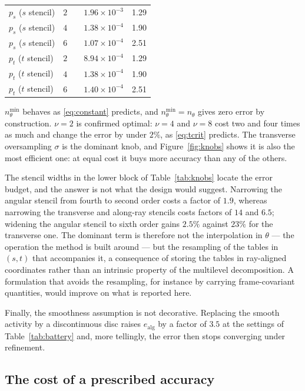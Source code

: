 \documentclass[11pt]{article}
\begin{document}
\begin{table}[t]
\begin{tabular}{llrrr}
\addlinespace
$p_s$ ($s$ stencil) & $2$ &  & $1.96\!\times\!10^{-3}$ & 1.29 \\
$p_s$ ($s$ stencil) & $4$ &  & $1.38\!\times\!10^{-4}$ & 1.90 \\
$p_s$ ($s$ stencil) & $6$ &  & $1.07\!\times\!10^{-4}$ & 2.51 \\
\addlinespace
$p_t$ ($t$ stencil) & $2$ &  & $8.94\!\times\!10^{-4}$ & 1.29 \\
$p_t$ ($t$ stencil) & $4$ &  & $1.38\!\times\!10^{-4}$ & 1.90 \\
$p_t$ ($t$ stencil) & $6$ &  & $1.40\!\times\!10^{-4}$ & 2.51 \\
\bottomrule
\end{tabular}
\end{table}

$n_\theta^{\min}$ behaves as \eqref{eq:constant} predicts, and
$n_\theta^{\min}=n_\theta$ gives zero error by construction. $\nu=2$ is
confirmed optimal: $\nu=4$ and $\nu=8$ cost two and four times as much and
change the error by under $2\%$, as \eqref{eq:tcrit} predicts. The transverse
oversampling $\sigma$ is the dominant knob, and Figure~\ref{fig:knobs} shows
it is also the most efficient one: at equal cost it buys more accuracy than any
of the others.

The stencil widths in the lower block of Table~\ref{tab:knobs} locate the error
budget, and the answer is not what the design would suggest. Narrowing the
angular stencil from fourth to second order costs a factor of $1.9$, whereas
narrowing the transverse and along-ray stencils costs factors of $14$ and
$6.5$; widening the angular stencil to sixth order gains $2.5\%$ against
$23\%$ for the transverse one. The dominant term is therefore not the
interpolation in $\theta$ --- the operation the method is built around --- but
the resampling of the tables in $(s,t)$ that accompanies it, a consequence of
storing the tables in ray-aligned coordinates rather than an intrinsic property
of the multilevel decomposition. A formulation that avoids the resampling, for
instance by carrying frame-covariant quantities, would improve on what is
reported here.

Finally, the smoothness assumption is not decorative. Replacing the smooth
activity by a discontinuous disc raises $e_{\mathrm{alg}}$ by a factor of
$3.5$ at the settings of Table~\ref{tab:battery} and, more tellingly, the
error then stops converging under refinement.

\subsection{The cost of a prescribed accuracy}
\label{sec:order}
\end{document}
